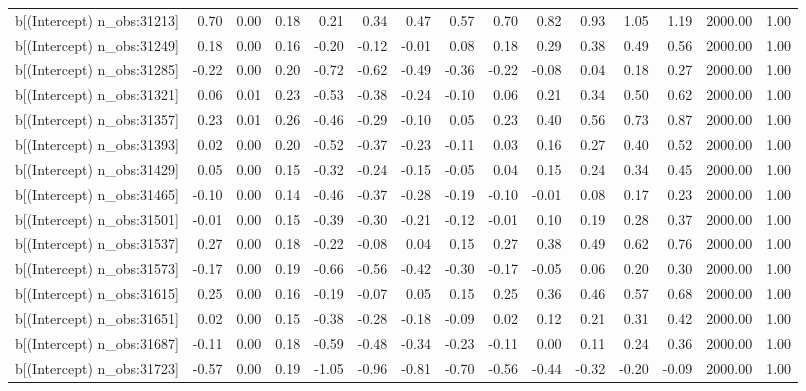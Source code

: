 \begin{table}[ht]
\begin{tabular}{rrrrrrrrrrrrrrr}
  b[(Intercept) n\_obs:31213] & 0.70 & 0.00 & 0.18 & 0.21 & 0.34 & 0.47 & 0.57 & 0.70 & 0.82 & 0.93 & 1.05 & 1.19 & 2000.00 & 1.00 \\ 
  b[(Intercept) n\_obs:31249] & 0.18 & 0.00 & 0.16 & -0.20 & -0.12 & -0.01 & 0.08 & 0.18 & 0.29 & 0.38 & 0.49 & 0.56 & 2000.00 & 1.00 \\ 
  b[(Intercept) n\_obs:31285] & -0.22 & 0.00 & 0.20 & -0.72 & -0.62 & -0.49 & -0.36 & -0.22 & -0.08 & 0.04 & 0.18 & 0.27 & 2000.00 & 1.00 \\ 
  b[(Intercept) n\_obs:31321] & 0.06 & 0.01 & 0.23 & -0.53 & -0.38 & -0.24 & -0.10 & 0.06 & 0.21 & 0.34 & 0.50 & 0.62 & 2000.00 & 1.00 \\ 
  b[(Intercept) n\_obs:31357] & 0.23 & 0.01 & 0.26 & -0.46 & -0.29 & -0.10 & 0.05 & 0.23 & 0.40 & 0.56 & 0.73 & 0.87 & 2000.00 & 1.00 \\ 
  b[(Intercept) n\_obs:31393] & 0.02 & 0.00 & 0.20 & -0.52 & -0.37 & -0.23 & -0.11 & 0.03 & 0.16 & 0.27 & 0.40 & 0.52 & 2000.00 & 1.00 \\ 
  b[(Intercept) n\_obs:31429] & 0.05 & 0.00 & 0.15 & -0.32 & -0.24 & -0.15 & -0.05 & 0.04 & 0.15 & 0.24 & 0.34 & 0.45 & 2000.00 & 1.00 \\ 
  b[(Intercept) n\_obs:31465] & -0.10 & 0.00 & 0.14 & -0.46 & -0.37 & -0.28 & -0.19 & -0.10 & -0.01 & 0.08 & 0.17 & 0.23 & 2000.00 & 1.00 \\ 
  b[(Intercept) n\_obs:31501] & -0.01 & 0.00 & 0.15 & -0.39 & -0.30 & -0.21 & -0.12 & -0.01 & 0.10 & 0.19 & 0.28 & 0.37 & 2000.00 & 1.00 \\ 
  b[(Intercept) n\_obs:31537] & 0.27 & 0.00 & 0.18 & -0.22 & -0.08 & 0.04 & 0.15 & 0.27 & 0.38 & 0.49 & 0.62 & 0.76 & 2000.00 & 1.00 \\ 
  b[(Intercept) n\_obs:31573] & -0.17 & 0.00 & 0.19 & -0.66 & -0.56 & -0.42 & -0.30 & -0.17 & -0.05 & 0.06 & 0.20 & 0.30 & 2000.00 & 1.00 \\ 
  b[(Intercept) n\_obs:31615] & 0.25 & 0.00 & 0.16 & -0.19 & -0.07 & 0.05 & 0.15 & 0.25 & 0.36 & 0.46 & 0.57 & 0.68 & 2000.00 & 1.00 \\ 
  b[(Intercept) n\_obs:31651] & 0.02 & 0.00 & 0.15 & -0.38 & -0.28 & -0.18 & -0.09 & 0.02 & 0.12 & 0.21 & 0.31 & 0.42 & 2000.00 & 1.00 \\ 
  b[(Intercept) n\_obs:31687] & -0.11 & 0.00 & 0.18 & -0.59 & -0.48 & -0.34 & -0.23 & -0.11 & 0.00 & 0.11 & 0.24 & 0.36 & 2000.00 & 1.00 \\ 
  b[(Intercept) n\_obs:31723] & -0.57 & 0.00 & 0.19 & -1.05 & -0.96 & -0.81 & -0.70 & -0.56 & -0.44 & -0.32 & -0.20 & -0.09 & 2000.00 & 1.00 \\ 

\end{tabular}
\end{table}
